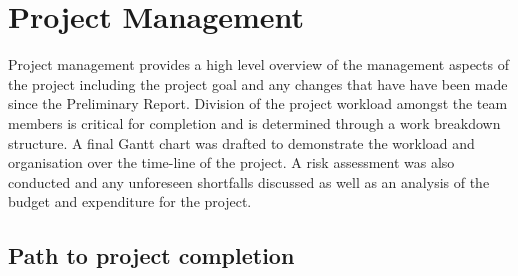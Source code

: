 \documentclass[main.tex]{subfiles}
\begin{document}
\chapter{Project Management}

Project management provides a high level overview of the management aspects of the project including the project goal and any changes that have have been made since the Preliminary Report. Division of the project workload amongst the team members is critical for completion and is determined through a work breakdown structure. A final Gantt chart was drafted to demonstrate the workload and organisation over the time-line of the project. A risk assessment was also conducted and any unforeseen shortfalls discussed as well as an analysis of the budget and expenditure for the project.

\section{Path to project completion}
\end{document}
